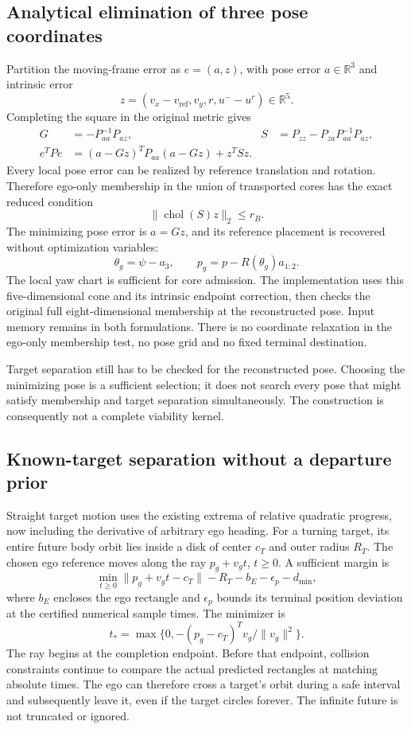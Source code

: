 \documentclass[11pt]{article}
\begin{document}
\subsection{Analytical elimination of three pose coordinates}
Partition the moving-frame error as $e=(a,z)$, with pose error $a\in\mathbb R^3$
and intrinsic error
\[
z=(v_x-v_{\mathrm{ref}},v_y,r,u^{-}-u^r)\in\mathbb R^5.
\]
Completing the square in the original metric gives
\begin{align}
G&=-P_{aa}^{-1}P_{az}, &
S&=P_{zz}-P_{za}P_{aa}^{-1}P_{az},\\
e^TPe&=(a-Gz)^TP_{aa}(a-Gz)+z^TSz.
\end{align}
Every local pose error can be realized by reference translation and rotation.
Therefore ego-only membership in the union of transported cores has the exact
reduced condition
\[
\boxed{\|\operatorname{chol}(S)z\|_2\le r_B.}
\]
The minimizing pose error is $a=Gz$, and its reference placement is recovered
without optimization variables:
\[
\theta_g=\psi-a_3,\qquad p_g=p-R(\theta_g)a_{1:2}.
\]
The local yaw chart is sufficient for core admission. The implementation uses
this five-dimensional cone and its intrinsic endpoint correction, then checks
the original full eight-dimensional membership at the reconstructed pose.
Input memory remains in both formulations. There is no coordinate relaxation
in the ego-only membership test, no pose grid and no fixed terminal destination.

Target separation still has to be checked for the reconstructed pose. Choosing
the minimizing pose is a sufficient selection; it does not search every pose
that might satisfy membership and target separation simultaneously. The
construction is consequently not a complete viability kernel.

\subsection{Known-target separation without a departure prior}
Straight target motion uses the existing extrema of relative quadratic
progress, now including the derivative of arbitrary ego heading. For a
turning target, its entire future body orbit lies inside a disk of center
$c_T$ and outer radius $R_T$. The chosen ego reference moves along the ray
$p_g+v_g t$, $t\ge0$. A sufficient margin is
\[
\min_{t\ge0}\|p_g+v_gt-c_T\|-R_T-b_E-\epsilon_p-d_{\min},
\]
where $b_E$ encloses the ego rectangle and $\epsilon_p$ bounds its terminal
position deviation at the certified numerical sample times. The minimizer is
\[
t_* = \max\{0,-(p_g-c_T)^Tv_g/\|v_g\|^2\}.
\]
The ray begins at the completion endpoint. Before that endpoint, collision
constraints continue to compare the actual predicted rectangles at matching
absolute times. The ego can therefore cross a target's orbit during a safe
interval and subsequently leave it, even if the target circles forever.
The infinite future is not truncated or ignored.
\end{document}
